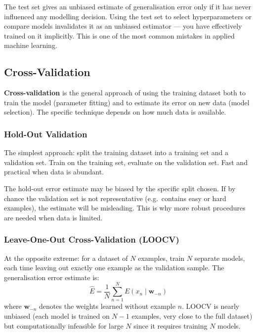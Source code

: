\documentclass[11pt,a4paper]{article}
\newcommand{\term}[1]{\textcolor{DefGreen}{\textbf{#1}}}
\begin{document}
\begin{warnbox}
The test set gives an unbiased estimate of generalisation error only if it has never influenced any modelling decision. Using the test set to select hyperparameters or compare models invalidates it as an unbiased estimator — you have effectively trained on it implicitly. This is one of the most common mistakes in applied machine learning.
\end{warnbox}

\subsection{Cross-Validation}

\term{Cross-validation} is the general approach of using the training dataset both to train the model (parameter fitting) and to estimate its error on new data (model selection). The specific technique depends on how much data is available.

\subsubsection{Hold-Out Validation}

The simplest approach: split the training dataset into a training set and a validation set. Train on the training set, evaluate on the validation set. Fast and practical when data is abundant.

\begin{notebox}
The hold-out error estimate may be biased by the specific split chosen. If by chance the validation set is not representative (e.g.\ contains easy or hard examples), the estimate will be misleading. This is why more robust procedures are needed when data is limited.
\end{notebox}

\subsubsection{Leave-One-Out Cross-Validation (LOOCV)}

At the opposite extreme: for a dataset of $N$ examples, train $N$ separate models, each time leaving out exactly one example as the validation sample. The generalisation error estimate is:
\[
\hat{E} = \frac{1}{N}\sum_{n=1}^N E(x_n \mid \mathbf{w}_{-n})
\]
where $\mathbf{w}_{-n}$ denotes the weights learned without example $n$. LOOCV is nearly unbiased (each model is trained on $N-1$ examples, very close to the full dataset) but computationally infeasible for large $N$ since it requires training $N$ models.
\end{document}
